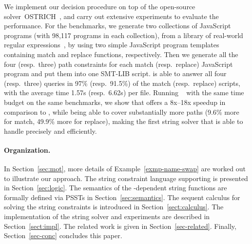 We implement our decision procedure
on top of the open-source solver~OSTRICH~\cite{CHL+19}, and carry out
extensive experiments to evaluate the performance. For the benchmarks,
we generate two collections of JavaScript programs (with 98,117
programs in each collection), from a library of real-world regular
expressions~\cite{DMC+19}, by using two simple JavaScript program
templates containing match and replace functions, respectively.  Then
we generate all the four (resp.\ three) path constraints for each
match (resp.\ replace) JavaScript program and put them into one
SMT-LIB script. {\ostrich} is able to answer all four (resp.\ three)
queries in 97\% (resp.\ 91.5\%) of the match (resp.\ replace) scripts,
with the average time 1.57s (resp.\ 6.62s) per file.  Running
\expose{}~\cite{LMK19} with the same time budget on the same
benchmarks, we show that \ostrich{} offers a 8x--18x speedup in
comparison to \expose{}, while being able to cover substantially more
paths (9.6\% more for match, 49.9\% more for replace), making \ostrich{} the first string solver that is able to
handle \regexps{} precisely and efficiently.

\paragraph{Organization.} In Section~\ref{sec:mot}, more details of Example~\ref{exmp-name-swap} are worked out to illustrate our approach. The string constraint language supporting {\regexps} is presented in Section~\ref{sec:logic}. The semantics of the {\regexp}-dependent string functions are formally defined via PSSTs in Section~\ref{sec:semantics}. The sequent calculus for solving the string constraints is introduced in Section~\ref{sect:calculus}. The implementation of the string solver and experiments are described in Section~\ref{sect:impl}. The related work is given in Section~\ref{sec-related}. Finally, Section~\ref{sec-conc} concludes this paper.


